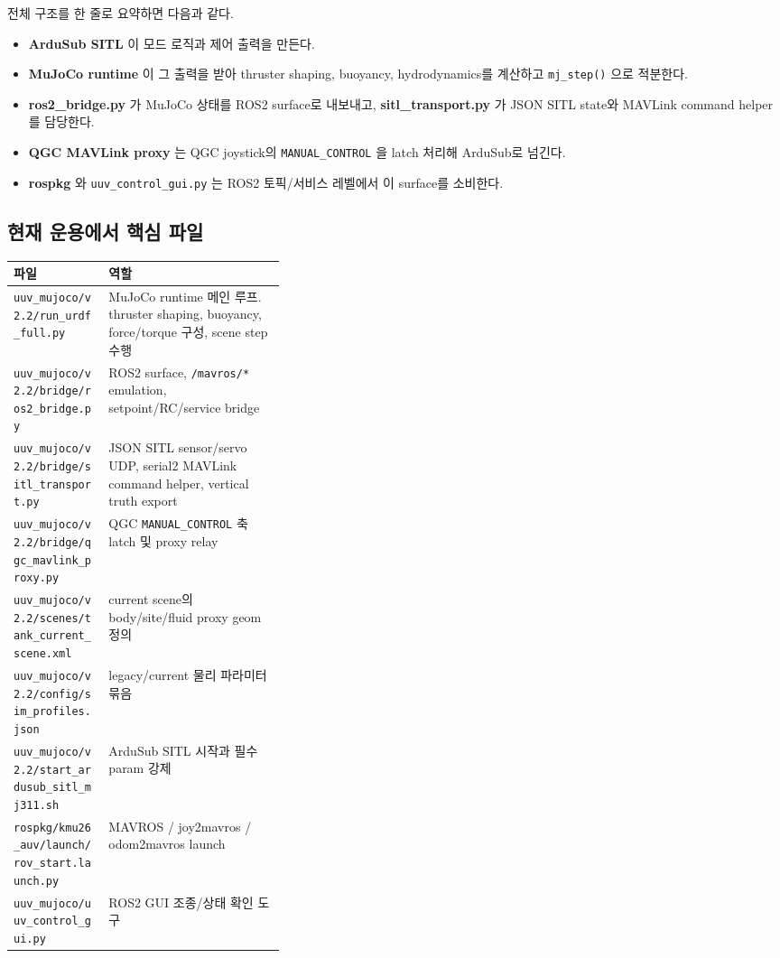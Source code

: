 \documentclass[11pt,a4paper]{article}
\newcommand{\code}[1]{\nolinkurl{#1}}
\begin{document}
전체 구조를 한 줄로 요약하면 다음과 같다.

\begin{itemize}[leftmargin=2em]
  \item \textbf{ArduSub SITL} 이 모드 로직과 제어 출력을 만든다.
  \item \textbf{MuJoCo runtime} 이 그 출력을 받아 thruster shaping, buoyancy, hydrodynamics를 계산하고 \code{mj\_step()} 으로 적분한다.
  \item \textbf{ros2\_bridge.py} 가 MuJoCo 상태를 ROS2 surface로 내보내고, \textbf{sitl\_transport.py} 가 JSON SITL state와 MAVLink command helper를 담당한다.
  \item \textbf{QGC MAVLink proxy} 는 QGC joystick의 \code{MANUAL\_CONTROL} 을 latch 처리해 ArduSub로 넘긴다.
  \item \textbf{rospkg} 와 \code{uuv\_control\_gui.py} 는 ROS2 토픽/서비스 레벨에서 이 surface를 소비한다.
\end{itemize}

\subsection{현재 운용에서 핵심 파일}

\begin{center}
\small
\begin{tabularx}{\linewidth}{>{\raggedright\arraybackslash}p{0.35\linewidth}Y}
\toprule
파일 & 역할 \\
\midrule
\code{uuv\_mujoco/v2.2/run\_urdf\_full.py} & MuJoCo runtime 메인 루프. thruster shaping, buoyancy, force/torque 구성, scene step 수행 \\
\code{uuv\_mujoco/v2.2/bridge/ros2\_bridge.py} & ROS2 surface, \code{/mavros/*} emulation, setpoint/RC/service bridge \\
\code{uuv\_mujoco/v2.2/bridge/sitl\_transport.py} & JSON SITL sensor/servo UDP, serial2 MAVLink command helper, vertical truth export \\
\code{uuv\_mujoco/v2.2/bridge/qgc\_mavlink\_proxy.py} & QGC \code{MANUAL\_CONTROL} 축 latch 및 proxy relay \\
\code{uuv\_mujoco/v2.2/scenes/tank\_current\_scene.xml} & current scene의 body/site/fluid proxy geom 정의 \\
\code{uuv\_mujoco/v2.2/config/sim\_profiles.json} & legacy/current 물리 파라미터 묶음 \\
\code{uuv\_mujoco/v2.2/start\_ardusub\_sitl\_mj311.sh} & ArduSub SITL 시작과 필수 param 강제 \\
\code{rospkg/kmu26\_auv/launch/rov\_start.launch.py} & MAVROS / joy2mavros / odom2mavros launch \\
\code{uuv\_mujoco/uuv\_control\_gui.py} & ROS2 GUI 조종/상태 확인 도구 \\
\bottomrule
\end{tabularx}
\end{center}
\end{document}
